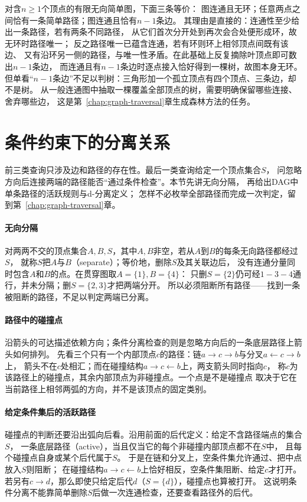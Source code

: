 对含$n\geq1$个顶点的有限无向简单图，下面三条等价：
图连通且无环；任意两点之间恰有一条简单路径；图连通且恰有$n-1$条边。
其理由是直接的：连通性至少给出一条路径，若有两条不同路径，
从它们首次分开处到再次会合处便形成环，故无环时路径唯一；
反之路径唯一已蕴含连通，若有环则环上相邻顶点间既有该边、
又有沿环另一侧的路径，与唯一性矛盾。在此基础上反复摘除叶顶点即可数出$n-1$条边，
而连通且有$n-1$条边时逐点接入恰好得到一棵树，故图本身无环。
但单看“$n-1$条边”不足以判树：三角形加一个孤立顶点有四个顶点、三条边，却不是树。
从一般连通图中抽取一棵覆盖全部顶点的树，需要明确保留哪些连接、舍弃哪些边，
这是第~\ref{chap:graph-traversal}章生成森林方法的任务。

\section{条件约束下的分离关系}
\label{sec:graph-paths-conditional-separation}

前三类查询只涉及边和路径的存在性。最后一类查询给定一个顶点集合$S$，
问忽略方向后连接两端的路径能否“通过条件检查”。本节先讲无向分隔，
再给出DAG中单条路径的活跃规则与d-分离定义；
怎样不必枚举全部路径而完成一次判定，留到第~\ref{chap:graph-traversal}章。

\paragraph{无向分隔}
对两两不交的顶点集合$A,B,S$，其中$A,B$非空，若从$A$到$B$的每条无向路径都经过$S$，
就称$S$把$A$与$B$（separate）；等价地，删除$S$及其关联边后，
没有连通分量同时包含$A$和$B$的点。在贯穿图取$A=\{1\},B=\{4\}$：
只删$S=\{2\}$仍可经$1-3-4$通行，并未分隔；删$S=\{2,3\}$才把两端分开。
所以必须阻断所有路径——找到一条被阻断的路径，不足以判定两端已分离。

\paragraph{路径中的碰撞点}
沿箭头的可达描述依赖方向；条件分离检查的则是忽略方向后的一条底层路径上箭头如何排列。
先看三个只有一个内部顶点$c$的路径：链$a\to c\to b$与分叉$a\leftarrow c\to b$上，
箭头不在$c$处相汇；而在碰撞结构$a\to c\leftarrow b$上，两支箭头同时指向$c$，
称$c$为该路径上的碰撞点，其余内部顶点为非碰撞点。一个点是不是碰撞点
取决于它在当前路径上相邻两弧的方向，并不是该顶点的固定类别。

\paragraph{给定条件集后的活跃路径}
碰撞点的判断还要沿出弧向后看。沿用前面的后代定义：给定不含路径端点的集合$S$，
一条底层路径（active），当且仅当它的每个非碰撞内部顶点都不在$S$中，
且每个碰撞点自身或某个后代属于$S$。
于是在链和分叉上，空条件集允许通过、把中点放入$S$则阻断；
在碰撞结构$a\to c\leftarrow b$上恰好相反，空条件集阻断、给定$c$才打开。
若另有$c\to d$，那么即使只给定后代$d$（$S=\{d\}$），碰撞点也算被打开。
这说明条件分离不能靠简单删除$S$后做一次连通检查，还要查看路径外的后代。

